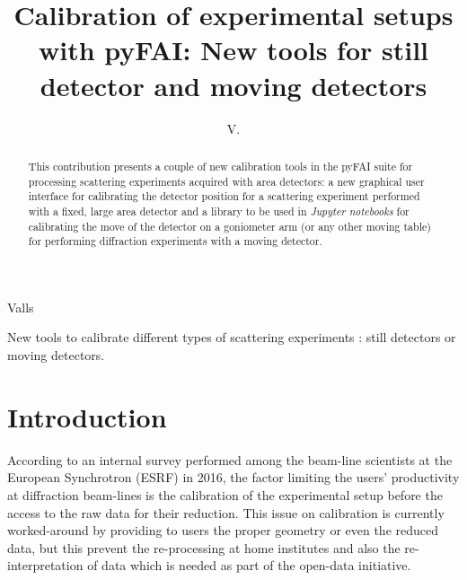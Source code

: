 \documentclass[preprint, pdf]{iucr}              %
\begin{document}

\title{Calibration of experimental setups with {pyFAI}: New tools for still
detector and moving detectors}

 \author[a]{V.}{Valls}







\maketitle                        %

\begin{synopsis}
New tools to calibrate different types of scattering experiments : still
detectors or moving detectors.
\end{synopsis}

\begin{abstract}


This contribution presents a couple of new calibration tools in the pyFAI suite
for processing scattering experiments acquired with area detectors:
a new graphical user interface for calibrating the detector position for a
scattering experiment performed with a fixed, large area detector and
a library to be used in \textit{Jupyter notebooks} for calibrating the move of the
detector on a goniometer arm (or any other moving table) for performing
diffraction experiments with a moving detector.
\end{abstract}


\section{Introduction}

According to an internal survey performed among the beam-line scientists at
the European Synchrotron (ESRF) in 2016, the factor limiting the users'
productivity at diffraction beam-lines is the calibration of the experimental
setup before the access to the raw data for their reduction.
This issue on calibration is currently worked-around by providing to users the
proper geometry or even the reduced data, but this prevent the
re-processing at home institutes and also the re-interpretation of data which
is needed as part of the open-data initiative.
\end{document}
